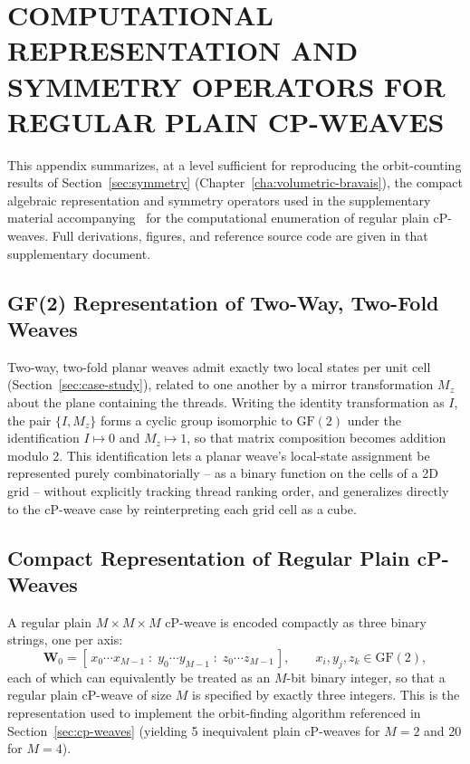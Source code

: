 %
%


\chapter{\uppercase{Computational Representation and Symmetry Operators for Regular Plain cP-Weaves}}
\label{app:cp-symmetry}

This appendix summarizes, at a level sufficient for reproducing the orbit-counting results of Section~\ref{sec:symmetry} (Chapter~\ref{cha:volumetric-bravais}), the compact algebraic representation and symmetry operators used in the supplementary material accompanying~\cite{yildiz2025volumetric} for the computational enumeration of regular plain cP-weaves. Full derivations, figures, and reference source code are given in that supplementary document.

\section{GF(2) Representation of Two-Way, Two-Fold Weaves}

Two-way, two-fold planar weaves admit exactly two local states per unit cell (Section~\ref{sec:case-study}), related to one another by a mirror transformation $M_z$ about the plane containing the threads. Writing the identity transformation as $I$, the pair $\{I, M_z\}$ forms a cyclic group isomorphic to $\mathrm{GF}(2)$ under the identification $I \mapsto 0$ and $M_z \mapsto 1$, so that matrix composition becomes addition modulo 2. This identification lets a planar weave's local-state assignment be represented purely combinatorially -- as a binary function on the cells of a 2D grid -- without explicitly tracking thread ranking order, and generalizes directly to the cP-weave case by reinterpreting each grid cell as a cube.

\section{Compact Representation of Regular Plain cP-Weaves}

A regular plain $M\times M\times M$ cP-weave is encoded compactly as three binary strings, one per axis:
\[
\mathbf{W}_0 = [\,x_0 \cdots x_{M-1} \;:\; y_0 \cdots y_{M-1} \;:\; z_0 \cdots z_{M-1}\,], \qquad x_i, y_j, z_k \in \mathrm{GF}(2),
\]
each of which can equivalently be treated as an $M$-bit binary integer, so that a regular plain cP-weave of size $M$ is specified by exactly three integers. This is the representation used to implement the orbit-finding algorithm referenced in Section~\ref{sec:cp-weaves} (yielding 5 inequivalent plain cP-weaves for $M=2$ and 20 for $M=4$).

